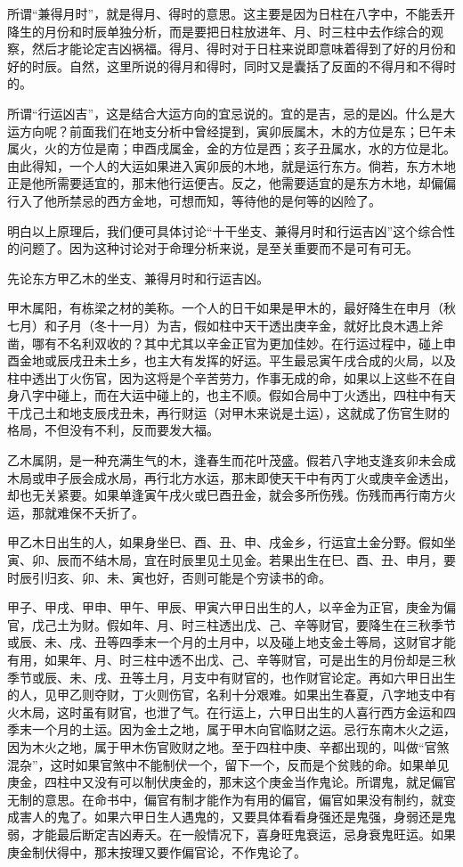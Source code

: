 \documentclass[a5paper,oneside,12pt]{ctexbook}
\begin{document}
所谓“兼得月时”，就是得月、得时的意思。这主要是因为日柱在八字中，不能丢开降生的月份和时辰单独分析，而是要把日柱放进年、月、时三柱中去作综合的观察，然后才能论定吉凶祸福。得月、得时对于日柱来说即意味着得到了好的月份和好的时辰。自然，这里所说的得月和得时，同时又是囊括了反面的不得月和不得时的。

所谓“行运凶吉”，这是结合大运方向的宜忌说的。宜的是吉，忌的是凶。什么是大运方向呢？前面我们在地支分析中曾经提到，寅卯辰属木，木的方位是东；巳午未属火，火的方位是南；申酉戌属金，金的方位是西；亥子丑属水，水的方位是北。由此得知，一个人的大运如果进入寅卯辰的木地，就是运行东方。倘若，东方木地正是他所需要适宜的，那末他行运便吉。反之，他需要适宜的是东方木地，却偏偏行入了他所禁忌的西方金地，可想而知，等待他的是何等的凶险了。

明白以上原理后，我们便可具体讨论“十干坐支、兼得月时和行运吉凶”这个综合性的问题了。因为这种讨论对于命理分析来说，是至关重要而不是可有可无。

先论东方甲乙木的坐支、兼得月时和行运吉凶。

甲木属阳，有栋梁之材的美称。一个人的日干如果是甲木的，最好降生在申月（秋七月）和子月（冬十一月）为吉，假如柱中天干透出庚辛金，就好比良木遇上斧凿，哪有不名利双收的？其中尤其以辛金正官为更加佳妙。在行运过程中，碰上申酉金地或辰戌丑未土乡，也主大有发挥的好运。平生最忌寅午戌合成的火局，以及柱中透出丁火伤官，因为这将是个辛苦劳力，作事无成的命，如果以上这些不在自身八字中碰上，而在大运中碰上的，也主不顺。假如合局中丁火透出，四柱中有天干戊己土和地支辰戌丑未，再行财运（对甲木来说是土运），这就成了伤官生财的格局，不但没有不利，反而要发大福。

乙木属阴，是一种充满生气的木，逢春生而花叶茂盛。假若八字地支逢亥卯未会成木局或申子辰会成水局，再行北方水运，那末即使天干中有丙丁火或庚辛金透出，却也无关紧要。如果单逢寅午戌火或巳酉丑金，就会多所伤残。伤残而再行南方火运，那就难保不夭折了。

甲乙木日出生的人，如果身坐巳、酉、丑、申、戌金乡，行运宜土金分野。假如坐寅、卯、辰而不结木局，宜在时辰里见土见金。若果出生在巳、酉、丑、申月，要时辰引归亥、卯、未、寅也好，否则可能是个穷读书的命。

甲子、甲戌、甲申、甲午、甲辰、甲寅六甲日出生的人，以辛金为正官，庚金为偏官，戊己土为财。假如年、月、时三柱透出戊、己、辛等财官，要降生在三秋季节或辰、未、戌、丑等四季末一个月的土月中，以及碰上地支金土等局，这财官才能有用，如果年、月、时三柱中透不出戊、己、辛等财官，可是出生的月份却是三秋季节或辰、未、戌、丑等土月，月支中有财官的，也作财官论定。再如六甲日出生的人，见甲乙则夺财，丁火则伤官，名利十分艰难。如果出生春夏，八字地支中有火木局，这时虽有财官，也泄了气。在行运上，六甲日出生的人喜行西方金运和四季末一个月的土运。因为金土之地，属于甲木向官临财之运。忌行东南木火之运，因为木火之地，属于甲木伤官败财之地。至于四柱中庚、辛都出现的，叫做“官煞混杂”，这时如果官煞中不能制伏一个，留下一个，反而是个贫贱的命。如果单见庚金，四柱中又没有可以制伏庚金的，那末这个庚金当作鬼论。所谓鬼，就足偏官无制的意思。在命书中，偏官有制才能作为有用的偏官，偏官如果没有制约，就变成害人的鬼了。如果六甲日生人遇鬼的，又要具体看看身强还是鬼强，身弱还是鬼弱，才能最后断定吉凶寿夭。在一般情况下，喜身旺鬼衰运，忌身衰鬼旺运。如果庚金制伏得中，那末按理又要作偏官论，不作鬼论了。
\end{document}

